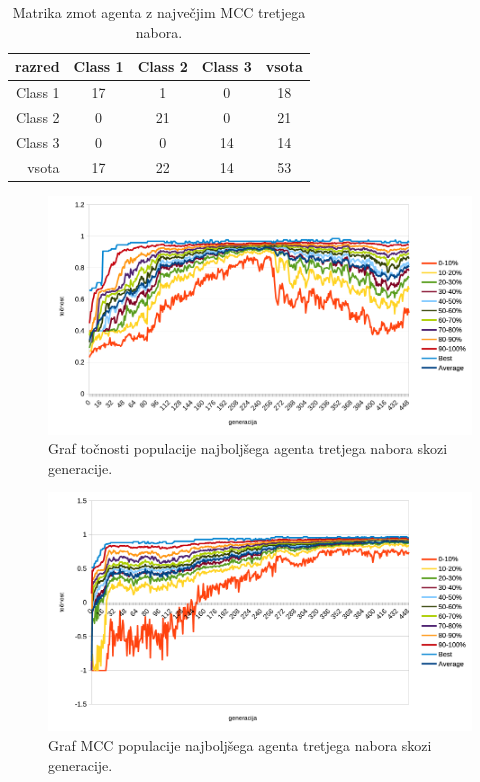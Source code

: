 \begin{table}[H]
    \centering
    \caption{Matrika zmot agenta z največjim MCC tretjega nabora.}
    \begin{tabular}{||rcccc||}
        \hline
        razred  & Class 1 & Class 2 & Class 3 & vsota \\ \hline
        Class 1 & 17      & 1       & 0       & 18    \\ \hline
        Class 2 & 0       & 21      & 0       & 21    \\ \hline
        Class 3 & 0       & 0       & 14      & 14    \\ \hline
        vsota   & 17      & 22      & 14      & 53    \\ \hline
    \end{tabular}
    \label{tab:wine_mcc_3}
\end{table}

\begin{figure}[H]
    \begin{center}
        \includegraphics[width=13cm]{wine/3/acc}
    \end{center}
    \caption{Graf točnosti populacije najboljšega agenta tretjega nabora skozi generacije.}
    \label{fig:wine_acc_3}
\end{figure}

\begin{figure}[H]
    \begin{center}
        \includegraphics[width=13cm]{wine/3/mcc}
    \end{center}
    \caption{Graf MCC populacije najboljšega agenta tretjega nabora skozi generacije.}
    \label{fig:wine_mcc_3}
\end{figure}

